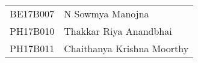 \def\arraystretch{1.25}
\begin{tabular}{c l}
	\hline
	BE17B007 & N Sowmya Manojna \\
	PH17B010 & Thakkar Riya Anandbhai \\
	PH17B011 & Chaithanya Krishna Moorthy \\
	\hline
\end{tabular}